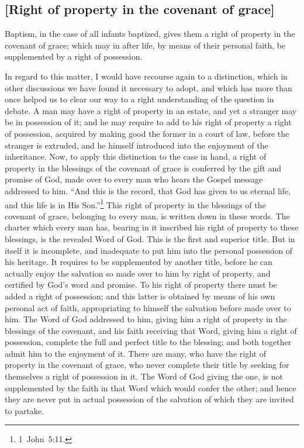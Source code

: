 \documentclass[
  english,
]{book}
\begin{document}
\hypertarget{right-of-property-in-the-covenant-of-grace}{%
\subsection{{[}Right of property in the covenant of grace{]}}\label{right-of-property-in-the-covenant-of-grace}}

Baptism, in the case of all infants baptized, gives them a right of property in the covenant of grace; which may in after life, by means of their personal faith, be supplemented by a right of possession.

In regard to this matter, I would have recourse again to a distinction, which in other discussions we have found it necessary to adopt, and which has more than once helped us to clear our way to a right understanding of the question in debate. A man may have a right of property in an estate, and yet a stranger may be in possession of it; and he may require to add to his right of property a right of possession, acquired by making good the former in a court of law, before the stranger is extruded, and he himself introduced into the enjoyment of the inheritance. Now, to apply this distinction to the case in hand, a right of property in the blessings of the covenant of grace is conferred by the gift and promise of God, made over to every man who hears the Gospel message addressed to him. ``And this is the record, that God has given to us eternal life, and this life is in His Son.''\footnote{1~John~5:11.} This right of property in the blessings of the covenant of grace, belonging to every man, is written down in these words. The charter which every man has, bearing in it inscribed his right of property to these blessings, is the revealed Word of God. This is the first and superior title. But in itself it is incomplete, and inadequate to put him into the personal possession of his heritage. It requires to be supplemented by another title, before he can actually enjoy the salvation so made over to him by right of property, and certified by God's word and promise. To his right of property there must be added a right of possession; and this latter is obtained by means of his own personal act of faith, appropriating to himself the salvation before made over to him. The Word of God addressed to him, giving him a right of property in the blessings of the covenant, and his faith receiving that Word, giving him a right of possession, complete the full and perfect title to the blessing; and both together admit him to the enjoyment of it. There are many, who have the right of property in the covenant of grace, who never complete their title by seeking for themselves a right of possession in it. The Word of God giving the one, is not supplemented by the faith in that Word which would confer the other; and hence they are never put in actual possession of the salvation of which they are invited to partake.
\end{document}
